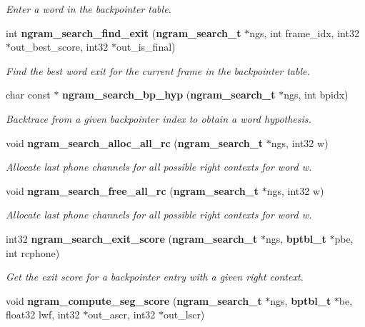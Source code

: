 \begin{DoxyCompactItemize}
\begin{DoxyCompactList}\small\item\em Enter a word in the backpointer table. \end{DoxyCompactList}\item 
int {\bf ngram\+\_\+search\+\_\+find\+\_\+exit} ({\bf ngram\+\_\+search\+\_\+t} $\ast$ngs, int frame\+\_\+idx, int32 $\ast$out\+\_\+best\+\_\+score, int32 $\ast$out\+\_\+is\+\_\+final)
\begin{DoxyCompactList}\small\item\em Find the best word exit for the current frame in the backpointer table. \end{DoxyCompactList}\item 
char const $\ast$ {\bf ngram\+\_\+search\+\_\+bp\+\_\+hyp} ({\bf ngram\+\_\+search\+\_\+t} $\ast$ngs, int bpidx)
\begin{DoxyCompactList}\small\item\em Backtrace from a given backpointer index to obtain a word hypothesis. \end{DoxyCompactList}\item 
void {\bf ngram\+\_\+search\+\_\+alloc\+\_\+all\+\_\+rc} ({\bf ngram\+\_\+search\+\_\+t} $\ast$ngs, int32 w)\label{ngram__search_8c_a1ddcc1a9cb3e164ceb2140097ed23a3e}

\begin{DoxyCompactList}\small\item\em Allocate last phone channels for all possible right contexts for word w. \end{DoxyCompactList}\item 
void {\bf ngram\+\_\+search\+\_\+free\+\_\+all\+\_\+rc} ({\bf ngram\+\_\+search\+\_\+t} $\ast$ngs, int32 w)\label{ngram__search_8c_a15477192481dffcb29e9c4167eff6c3c}

\begin{DoxyCompactList}\small\item\em Allocate last phone channels for all possible right contexts for word w. \end{DoxyCompactList}\item 
int32 {\bf ngram\+\_\+search\+\_\+exit\+\_\+score} ({\bf ngram\+\_\+search\+\_\+t} $\ast$ngs, {\bf bptbl\+\_\+t} $\ast$pbe, int rcphone)\label{ngram__search_8c_a25a80e488425b2bd4e24eb753c9295a5}

\begin{DoxyCompactList}\small\item\em Get the exit score for a backpointer entry with a given right context. \end{DoxyCompactList}\item 
void {\bfseries ngram\+\_\+compute\+\_\+seg\+\_\+score} ({\bf ngram\+\_\+search\+\_\+t} $\ast$ngs, {\bf bptbl\+\_\+t} $\ast$be, float32 lwf, int32 $\ast$out\+\_\+ascr, int32 $\ast$out\+\_\+lscr)\label{ngram__search_8c_a7526cf720a80052770c5b6f82c93749d}


\end{DoxyCompactItemize}
